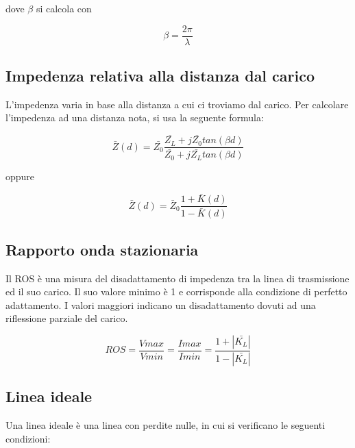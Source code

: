 \documentclass{article}
\begin{document}
    dove $\beta$ si calcola con

    \begin{equation}
        \beta = \frac{2 \pi}{\lambda}
    \end{equation}

    \subsection{Impedenza relativa alla distanza dal carico}

    L'impedenza varia in base alla distanza a cui ci troviamo dal carico. Per calcolare l'impedenza ad una distanza nota,
    si usa la seguente formula:

    \begin{equation}
        \bar{Z}(d) = \bar{Z_0} \frac{
            \bar{Z_L} + j \bar{Z_0} tan(\beta d)
        }{
            \bar{Z_0} + j \bar{Z_L} tan(\beta d)
        }
    \end{equation}

    oppure

    \begin{equation}
        \bar{Z}(d) = \bar{Z}_0 \frac{
            1 + \bar{K}(d)
        }{
            1 - \bar{K}(d)
        }
    \end{equation}



    \subsection{Rapporto onda stazionaria}

    Il ROS è una misura del disadattamento di impedenza tra la linea di trasmissione ed il suo carico. Il suo valore minimo
    è 1 e corrisponde alla condizione di perfetto adattamento. I valori maggiori indicano un disadattamento dovuti ad una
    riflessione parziale del carico.

    \begin{equation}
        ROS = \frac{Vmax}{Vmin} =
        \frac{Imax}{Imin} =
        \frac{
            1 + |\bar{K_L}|
        }{
            1 - |\bar{K_L}|
        }
    \end{equation}

    \subsection{Linea ideale}

    Una linea ideale è una linea con perdite nulle, in cui si verificano le seguenti condizioni:
\end{document}
